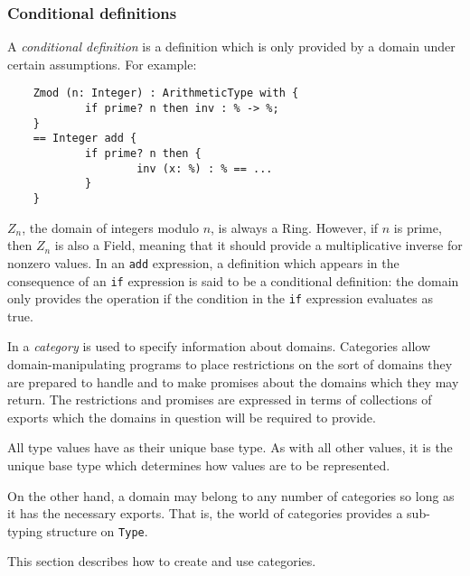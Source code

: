 {\subsubsection{Conditional definitions}

A {\em conditional definition\/} is a definition which is only provided
by a domain under certain assumptions.  For example:

\begin{small}
\begin{verbatim}
    Zmod (n: Integer) : ArithmeticType with {
            if prime? n then inv : % -> %;
    }
    == Integer add {
            if prime? n then {
                    inv (x: %) : % == ...
            }
    }
\end{verbatim}
\end{small}

$Z_n$, the domain of integers modulo $n$, is always a Ring.  However,
if $n$ is prime, then $Z_n$ is also a Field, meaning that it should
provide a multiplicative inverse for nonzero values.  In an \verb"add"
expression, a definition which appears in the consequence of an \verb"if"
expression is said to be a conditional definition:  the domain only provides
the operation if the condition in the \verb"if" expression evaluates as true.


In \asharp{} a {\em category\/} is used to specify information about domains.
Categories allow domain-manipulating programs to place restrictions on
the sort of domains they are prepared to handle and to make promises
about the domains which they may return.
The restrictions and promises are expressed in terms of collections of
exports which the domains in question will be required to provide.

All type values have  as their unique base type.
As with all other values, it is the unique base type which determines
how values are to be represented.   

On the other hand, a domain may belong to any number
of categories so long as it has the necessary exports.
That is, the world of categories provides a sub-typing
structure on \verb"Type".

This section describes how to create and use categories.

}
